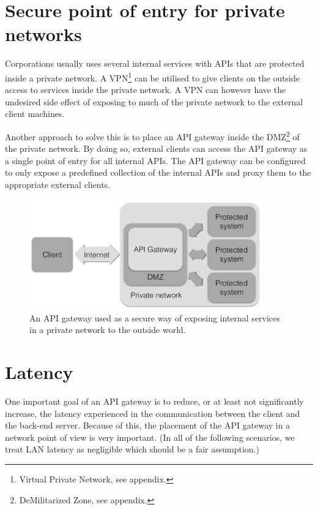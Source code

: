 \documentclass{cslthse-msc}
\begin{document}
\section{Secure point of entry for private networks}
Corporations usually uses several internal services with APIs that are protected inside a private network. A VPN\footnote{Virtual Private Network, see appendix.} can be utilised to give clients on the outside access to services inside the private network. A VPN can however have the undesired side effect of exposing to much of the private network to the external client machines.

Another approach to solve this is to place an API gateway inside the DMZ\footnote{DeMilitarized Zone, see appendix.} of the private network. By doing so, external clients can access the API gateway as a single point of entry for all internal APIs. The API gateway can be configured to only expose a predefined collection of the internal APIs and proxy them to the appropriate external clients.

\begin{figure}[H]
  \centering
    \begin{center}
      \includegraphics[width=0.9\textwidth]{images/api_gateway_dmz.png}
    \end{center}
  \caption{An API gateway used as a secure way of exposing internal services in a private network to the outside world.}
\end{figure}

\section{Latency}
One important goal of an API gateway is to reduce, or at least not significantly increase, the latency experienced in the communication between the client and the back-end server. Because of this, the placement of the API gateway in a network point of view is very important. (In all of the following scenarios, we treat LAN latency as negligible which should be a fair assumption.)
\end{document}
